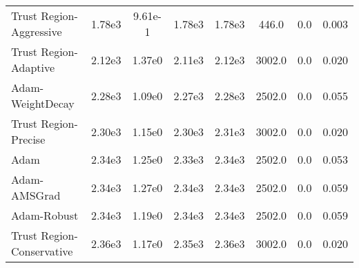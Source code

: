 \documentclass{article}
\begin{document}
\begin{table}[htbp]
{\begin{tabular}{p{2.5cm}*{7}{c}}
Trust Region-Aggressive & 1.78e3 & 9.61e-1 & 1.78e3 & 1.78e3 & 446.0 & 0.0 & 0.003 \\
Trust Region-Adaptive & 2.12e3 & 1.37e0 & 2.11e3 & 2.12e3 & 3002.0 & 0.0 & 0.020 \\
Adam-WeightDecay & 2.28e3 & 1.09e0 & 2.27e3 & 2.28e3 & 2502.0 & 0.0 & 0.055 \\
Trust Region-Precise & 2.30e3 & 1.15e0 & 2.30e3 & 2.31e3 & 3002.0 & 0.0 & 0.020 \\
Adam & 2.34e3 & 1.25e0 & 2.33e3 & 2.34e3 & 2502.0 & 0.0 & 0.053 \\
Adam-AMSGrad & 2.34e3 & 1.27e0 & 2.34e3 & 2.34e3 & 2502.0 & 0.0 & 0.059 \\
Adam-Robust & 2.34e3 & 1.19e0 & 2.34e3 & 2.34e3 & 2502.0 & 0.0 & 0.059 \\
Trust Region-Conservative & 2.36e3 & 1.17e0 & 2.35e3 & 2.36e3 & 3002.0 & 0.0 & 0.020 \\
\bottomrule
\end{tabular}
}
\end{table}
\end{document}
